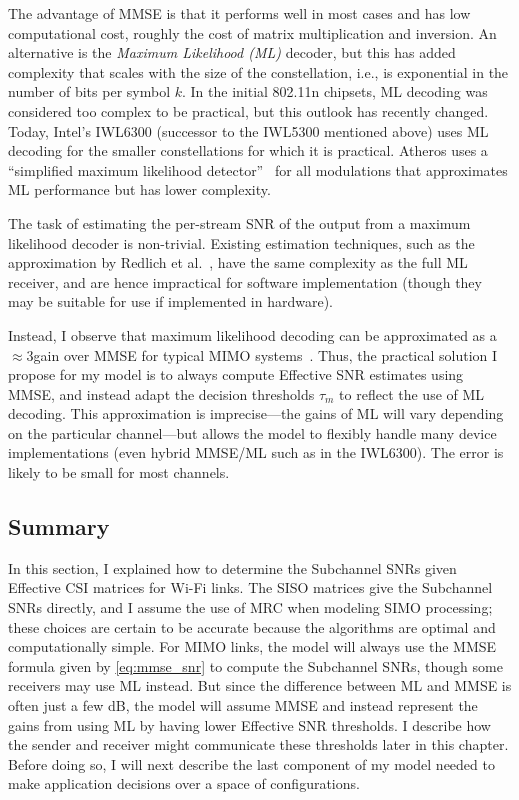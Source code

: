 The advantage of MMSE is that it performs well in most cases and has low computational cost, roughly the cost of matrix multiplication and inversion. An alternative is the \emph{Maximum Likelihood (ML)} decoder, but this has added complexity that scales with the size of the constellation, i.e., is exponential in the number of bits per symbol $k$. In the initial 802.11n chipsets, ML decoding was considered too complex to be practical, but this outlook has recently changed. Today, Intel's IWL6300 (successor to the IWL5300 mentioned above) uses ML decoding for the smaller constellations for which it is practical. Atheros uses a ``simplified maximum likelihood detector''~\cite{ar6004,Atheros_11nTechPaper} for all modulations that approximates ML performance but has lower complexity.

The task of estimating the per-stream SNR of the output from a maximum likelihood decoder is non-trivial. Existing estimation techniques, such as the approximation by Redlich et al.~\cite{Redlich_MLSNR}, have the same complexity as the full ML receiver, and are hence impractical for software implementation (though they may be suitable for use if implemented in hardware).

Instead, I observe that maximum likelihood decoding can be approximated as a $\approx$3\dB gain over MMSE for typical MIMO systems~\cite{Kumar_ml_mmse}. Thus, the practical solution I propose for my model is to always compute Effective SNR estimates using MMSE, and instead adapt the decision thresholds $\tau_m$ to reflect the use of ML decoding. This approximation is imprecise---the gains of ML will vary depending on the particular channel---but allows the model to flexibly handle many device implementations (even hybrid MMSE/ML such as in the IWL6300). The error is likely to be small for most channels.

\subsection{Summary}
In this section, I explained how to determine the Subchannel SNRs given Effective CSI matrices for Wi-Fi links. The SISO matrices give the Subchannel SNRs directly, and I assume the use of MRC when modeling SIMO processing; these choices are certain to be accurate because the algorithms are optimal and computationally simple. For MIMO links, the model will always use the MMSE formula given by \eqref{eq:mmse_snr} to compute the Subchannel SNRs, though some receivers may use ML instead. But since the difference between ML and MMSE is often just a few dB, the model will assume MMSE and instead represent the gains from using ML by having lower Effective SNR thresholds. I describe how the sender and receiver might communicate these thresholds later in this chapter. Before doing so, I will next describe the last component of my model needed to make application decisions over a space of configurations.

